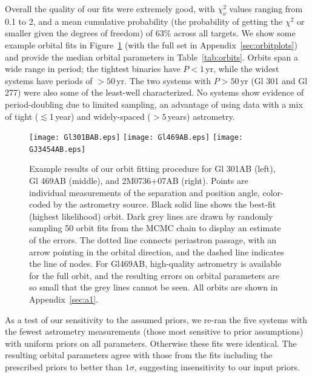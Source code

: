 \documentclass[twocolumn]{aastex62}
\begin{document}
Overall the quality of our fits were extremely good, with $\chi^2_\nu$ values ranging from 0.1 to 2, and a mean cumulative probability (the probability of getting the $\chi^2$ or smaller given the degrees of freedom) of 63\% across all targets. We show some example orbital fits in Figure~\ref{fig:orbits} (with the full set in Appendix~\ref{sec:orbitplots}) and provide the median orbital parameters in Table~\ref{tab:orbits}. Orbits span a wide range in period; the tightest binaries have $P<1$\,yr, while the widest systems have periods of $>50$\,yr. The two systems with $P>50$\,yr (Gl 301 and Gl 277) were also some of the least-well characterized. No systems show evidence of period-doubling due to limited sampling, an advantage of using data with a mix of tight ($\lesssim$1\,year) and widely-spaced ($>5$\,years) astrometry.

\begin{figure}[htb]
\begin{center}
\texttt{[image: Gl301BAB.eps]}
\texttt{[image: Gl469AB.eps]}
\texttt{[image: GJ3454AB.eps]}
\caption{Example results of our orbit fitting procedure for Gl 301AB (left), Gl 469AB (middle), and 2M0736+07AB (right). Points are individual measurements of the separation and position angle, color-coded by the astrometry source. Black solid line shows the best-fit (highest likelihood) orbit. Dark grey lines are drawn by randomly sampling 50 orbit fits from the MCMC chain to display an estimate of the errors. The dotted line connects periastron passage, with an arrow pointing in the orbital direction, and the dashed line indicates the line of nodes. For Gl469AB, high-quality astrometry is available for the full orbit, and the resulting errors on orbital parameters are so small that the grey lines cannot be seen. All orbits are shown in Appendix~\ref{sec:a1}.}
\label{fig:orbits}
\end{center}
\end{figure}

As a test of our sensitivity to the assumed priors, we re-ran the five systems with the fewest astrometry measurements (those most sensitive to prior assumptions) with uniform priors on all parameters. Otherwise these fits were identical. The resulting orbital parameters agree with those from the fits including the prescribed priors to better than $1\sigma$, suggesting insensitivity to our input priors. 
\end{document}
